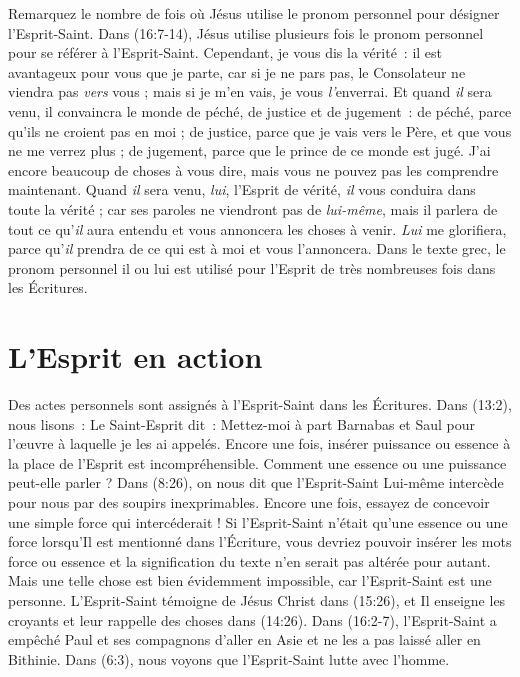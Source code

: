 Remarquez le nombre de fois où Jésus utilise le pronom personnel pour
 désigner l'Esprit-Saint. Dans (16:7-14), Jésus utilise
 plusieurs fois le pronom personnel pour se référer à l'Esprit-Saint.
 \og Cependant, je vous dis la vérité~: il est avantageux pour vous
 que je parte, car si je ne pars pas, le Consolateur ne viendra pas
 \emph{vers} vous ; mais si je m'en vais, je vous \emph{l'}enverrai.
 Et quand \emph{il} sera venu, il convaincra le monde de péché,
 de justice et de jugement~: de péché, parce qu'ils ne croient pas en moi ;
 de justice, parce que je vais vers le Père, et que vous ne me verrez plus ;
 de jugement, parce que le prince de ce monde est jugé.
 J'ai encore beaucoup de choses à vous dire, mais vous ne pouvez pas
 les comprendre maintenant. Quand \emph{il} sera venu, \emph{lui},
 l'Esprit de vérité, \emph{il} vous conduira dans toute la vérité ;
 car ses paroles ne viendront pas de \emph{lui-même}, mais il parlera de
 tout ce qu'\emph{il} aura entendu et vous annoncera les choses à venir.
 \emph{Lui} me glorifiera, parce qu'\emph{il} prendra de ce qui est à moi
 et vous l'annoncera. \fg{}
 Dans le texte grec, le pronom personnel \og il \fg{} ou \og lui \fg{}
 est utilisé pour l'Esprit de très nombreuses fois dans les Écritures.

\section*{L'Esprit en action}

Des actes personnels sont assignés à l'Esprit-Saint dans les Écritures. Dans
 (13:2), nous lisons~: \og Le Saint-Esprit dit~:
 Mettez-moi à part Barnabas et Saul pour l'œuvre à laquelle je les ai
 appelés. \fg{}
 Encore une fois, insérer \og puissance \fg{} ou \og essence \fg{} à la place
 de l'Esprit est incompréhensible. Comment une essence ou une puissance
 peut-elle parler ? Dans (8:26), on nous dit que l'Esprit-Saint
 Lui-même intercède pour nous par des soupirs inexprimables.
 Encore une fois, essayez de concevoir une simple force qui intercéderait !
 Si l'Esprit-Saint n'était qu'une essence ou une force lorsqu'Il est mentionné
 dans l'Écriture, vous devriez pouvoir insérer les mots \og force \fg{} ou
 \og essence \fg{} et la signification du texte n'en serait pas altérée pour
 autant. Mais une telle chose est bien évidemment impossible, car
 l'Esprit-Saint est une personne. L'Esprit-Saint témoigne de Jésus Christ dans
 (15:26), et Il enseigne les croyants et leur rappelle des choses
 dans (14:26). Dans (16:2-7), l'Esprit-Saint a
 empêché Paul et ses compagnons d'aller en Asie et ne les a pas laissé aller
 en Bithinie. Dans (6:3), nous voyons que l'Esprit-Saint lutte
 avec l'homme.

